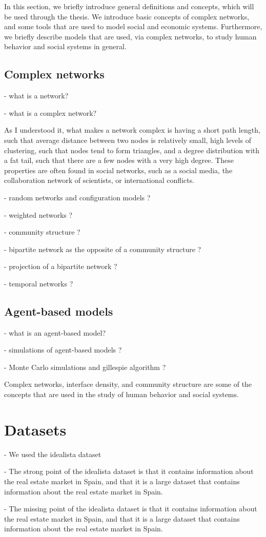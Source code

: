 In this section, we briefly introduce general definitions and concepts, which will be used through the thesis. We introduce basic concepts of complex networks, and some tools that are used to model social and economic systems. Furthermore, we briefly describe models that are used, via complex networks, to study human behavior and social systems in general.

\subsection{\label{subsec:Complex networks} Complex networks}

- what is a network?

- what is a complex network?

As I understood it, what makes a network complex is having a short path length, such that average distance between two nodes is relatively small, high levels of clustering, such that nodes tend to form triangles, and a degree distribution with a fat tail, such that there are a few nodes with a very high degree. These properties are often found in social networks, such as a social media, the collaboration network of scientists, or international conflicts.

- random networks and configuration models ?

- weighted networks ?

- community structure ?

- bipartite network as the opposite of a community structure ?

- projection of a bipartite network ?

- temporal networks ?

\subsection{\label{subsec:Agent-based models} Agent-based models}

- what is an agent-based model?

- simulations of agent-based models ?

- Monte Carlo simulations and gillespie algorithm ?



Complex networks, interface density, and community structure are some of the concepts that are used in the study of human behavior and social systems.



\section{\label{sec:Datasets} Datasets}

- We used the idealista dataset

- The strong point of the idealista dataset is that it contains information about the real estate market in Spain, and that it is a large dataset that contains information about the real estate market in Spain.

- The missing point of the idealista dataset is that it contains information about the real estate market in Spain, and that it is a large dataset that contains information about the real estate market in Spain.
